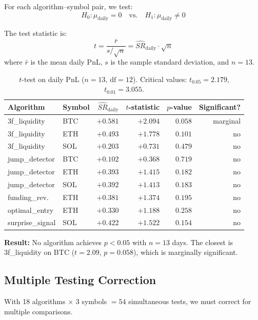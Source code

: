 \documentclass[11pt,a4paper]{article}
\newcommand{\toprule}{\hline\hline}
\newcommand{\midrule}{\hline}
\newcommand{\bottomrule}{\hline\hline}
\begin{document}
For each algorithm--symbol pair, we test:
\begin{equation}
H_0: \mu_{\text{daily}} = 0 \quad \text{vs.} \quad H_1: \mu_{\text{daily}} \neq 0
\end{equation}

The test statistic is:
\begin{equation}
t = \frac{\bar{r}}{s / \sqrt{n}} = \widehat{SR}_{\text{daily}} \cdot \sqrt{n}
\end{equation}
where $\bar{r}$ is the mean daily PnL, $s$ is the sample standard deviation, and $n = 13$.

\begin{table}[h!]
\centering
\caption{$t$-test on daily PnL ($n = 13$, $\text{df} = 12$). Critical values: $t_{0.05} = 2.179$, $t_{0.01} = 3.055$.}
\label{tab:ttest}
\small
\begin{tabular}{@{}llrrrr@{}}
\toprule
Algorithm & Symbol & $\widehat{SR}_{\text{daily}}$ & $t$-statistic & $p$-value & Significant? \\
\midrule
3f\_liquidity & BTC & $+0.581$ & $+2.094$ & $0.058$ & marginal \\
3f\_liquidity & ETH & $+0.493$ & $+1.778$ & $0.101$ & no \\
3f\_liquidity & SOL & $+0.203$ & $+0.731$ & $0.479$ & no \\
\midrule
jump\_detector & BTC & $+0.102$ & $+0.368$ & $0.719$ & no \\
jump\_detector & ETH & $+0.393$ & $+1.415$ & $0.182$ & no \\
jump\_detector & SOL & $+0.392$ & $+1.413$ & $0.183$ & no \\
\midrule
funding\_rev. & ETH & $+0.381$ & $+1.374$ & $0.195$ & no \\
optimal\_entry & ETH & $+0.330$ & $+1.188$ & $0.258$ & no \\
surprise\_signal & SOL & $+0.422$ & $+1.522$ & $0.154$ & no \\
\bottomrule
\end{tabular}
\end{table}

\textbf{Result:} No algorithm achieves $p < 0.05$ with $n = 13$ days. The closest is 3f\_liquidity on BTC ($t = 2.09$, $p = 0.058$), which is marginally significant.

\subsection{Multiple Testing Correction}

With 18 algorithms $\times$ 3 symbols $= 54$ simultaneous tests, we must correct for multiple comparisons.
\end{document}
